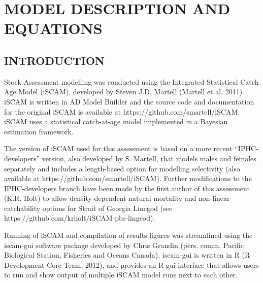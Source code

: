 
\def\beq{\vspace{-5ex} \begin{fleqn} \begin{equation}}
\def\eeq{\end{equation} \end{fleqn} \vspace{-5ex}}
\def\tabline{\vspace{2ex} \hrule \vspace{2ex}}
\def\newp{\vfill \break}

\clearpage

\chapter{MODEL DESCRIPTION AND EQUATIONS}

\section{INTRODUCTION}

Stock Assessment modelling was conducted using the Integrated Statistical Catch Age Model (iSCAM), developed by Steven J.D. Martell (Martell et al. 2011).  iSCAM is written in AD Model Builder and the source code and documentation for the original iSCAM is available at https://github.com/smartell/iSCAM.  iSCAM uses a statistical catch-at-age model implemented in a Bayesian estimation framework.

The version of iSCAM used for this assessment is based on a more recent “IPHC-developers” version, also developed by S. Martell, that models males and females separately and includes a length-based option for modelling selectivity (also available at https://github.com/smartell/iSCAM).  Further modifications to the IPHC-developers branch have been made by the first author of this assessment (K.R. Holt) to allow density-dependent natural mortality and non-linear catchability options for Strait of Georgia Lincgod (see https://github.com/krholt/iSCAM-pbs-lingcod).

Running of iSCAM and compilation of results figures was streamlined using the iscam-gui software package developed by Chris Grandin (pers. comm, Pacific Biological Station, Fisheries and Oceans Canada).  iscam-gui is written in R (R Development Core Team, 2012), and provides an R gui interface that allows users to run and show output of multiple iSCAM model runs next to each other.

